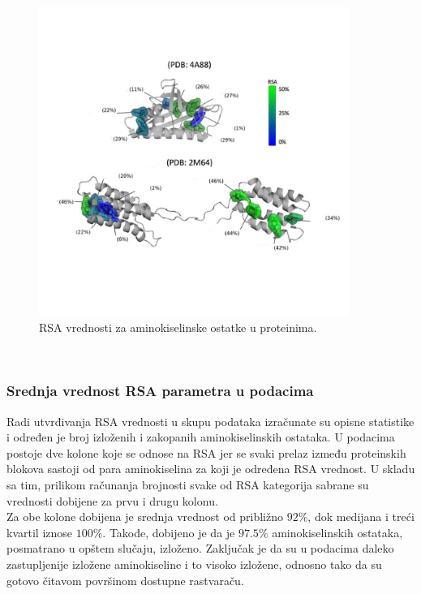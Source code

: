 \documentclass[a4paper,12pt]{article}
\begin{document}
\begin{figure}[htbp]
    \centering
    \includegraphics[width=0.9\textwidth]{./images/rsa.png}
    \caption{RSA vrednosti za aminokiselinske ostatke u proteinima.}
    \label{Slika:rsa}
\end{figure}
\\
\subsubsection{Srednja vrednost RSA parametra u podacima}
Radi utvrđivanja RSA vrednosti u skupu podataka izračunate su opisne statistike i određen je broj izloženih i zakopanih aminokiselinskih ostataka. U podacima postoje dve kolone koje se odnose na RSA jer se svaki prelaz između proteinskih blokova sastoji od para aminokiselina za koji je određena RSA vrednost. U skladu sa tim, prilikom računanja brojnosti svake od RSA kategorija sabrane su vrednosti dobijene za prvu i drugu kolonu. \\
Za obe kolone dobijena je srednja vrednost od približno $92\%$, dok medijana i treći kvartil iznose $100\%$. Takođe, dobijeno je da je $97.5\%$ aminokiselinskih ostataka, posmatrano u opštem slučaju, izloženo. Zaključak je da su u podacima daleko zastupljenije izložene aminokiseline i to visoko izložene, odnosno tako da su gotovo čitavom površinom dostupne rastvaraču.
\end{document}
